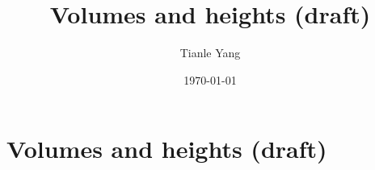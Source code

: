 \documentclass{noteformyself}
\title{Volumes and heights (draft)}
\author{Tianle Yang}
\date{\today}
\begin{document}
    \maketitle

    \section{Volumes and heights (draft)}

    

\end{document}
